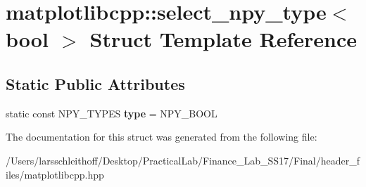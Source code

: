 \hypertarget{structmatplotlibcpp_1_1select__npy__type_3_01bool_01_4}{}\section{matplotlibcpp\+:\+:select\+\_\+npy\+\_\+type$<$ bool $>$ Struct Template Reference}
\label{structmatplotlibcpp_1_1select__npy__type_3_01bool_01_4}
\subsection*{Static Public Attributes}
\begin{DoxyCompactItemize}
\item 
\mbox{\label{structmatplotlibcpp_1_1select__npy__type_3_01bool_01_4_a79dc3db61a3b0f4796a29d067d5dd374}} 
static const N\+P\+Y\+\_\+\+T\+Y\+P\+ES {\bfseries type} = N\+P\+Y\+\_\+\+B\+O\+OL
\end{DoxyCompactItemize}


The documentation for this struct was generated from the following file\+:\begin{DoxyCompactItemize}
\item 
/\+Users/larsschleithoff/\+Desktop/\+Practical\+Lab/\+Finance\+\_\+\+Lab\+\_\+\+S\+S17/\+Final/header\+\_\+files/matplotlibcpp.\+hpp\end{DoxyCompactItemize}
